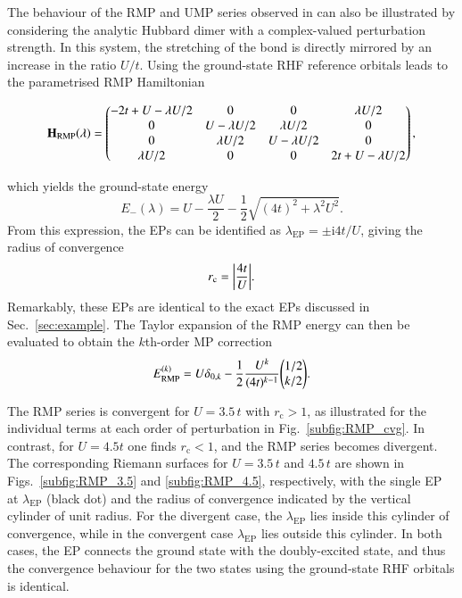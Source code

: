 \documentclass[aps,prb,reprint,noshowkeys,superscriptaddress]{revtex4-1}
\newcommand{\bH}{\mathbf{H}}
\renewcommand{\i}{\mathrm{i}} %
\newcommand{\rc}{r_{\text{c}}}
\newcommand{\lep}{\lambda_{\text{EP}}}
\begin{document}
The behaviour of the RMP and UMP series observed in  can also be illustrated by considering
the analytic Hubbard dimer with a complex-valued perturbation strength.
In this system, the stretching of the  bond is directly mirrored by an increase in the ratio $U/t$.
Using the ground-state RHF reference orbitals leads to the parametrised RMP Hamiltonian
\begin{widetext}
\begin{equation}
\label{eq:H_RMP}
\bH_\text{RMP}\qty(\lambda) = 
	\begin{pmatrix}
		-2t + U - \lambda U/2	&	0					&	0					&	\lambda U/2	\\
		0						&	U - \lambda U/2 	&	\lambda U/2			&	0	\\
		0						&	\lambda U/2			&	U - \lambda U/2 	&	0	\\
		\lambda U/2 			&	0 					&	0					&	2t + U - \lambda U/2	\\
	\end{pmatrix},
\end{equation}
\end{widetext}
which yields the ground-state energy 
\begin{equation}
	\label{eq:E0MP}
	E_{-}(\lambda) = U - \frac{\lambda U}{2} - \frac{1}{2} \sqrt{(4t)^2 + \lambda ^2 U^2}.
\end{equation}
From this expression, the EPs can be identified as $\lep = \pm \i 4t / U$,
giving the radius of convergence
\begin{equation}
    \rc = \abs{\frac{4t}{U}}.
\end{equation}
Remarkably, these EPs are identical to the exact EPs discussed in Sec.~\ref{sec:example}.
The Taylor expansion of the RMP energy can then be evaluated to obtain the $k$th-order MP correction
\begin{equation}
	E_\text{RMP}^{(k)} = U \delta_{0,k} - \frac{1}{2} \frac{U^k}{(4t)^{k-1}} \mqty( 1/2 \\ k/2).
\end{equation}
 
The RMP series is convergent for $U = 3.5\,t$ with $\rc > 1$, as illustrated for the individual terms at each order
of perturbation in Fig.~\ref{subfig:RMP_cvg}.
In contrast, for $U = 4.5t$ one finds $\rc < 1$, and the RMP series becomes divergent.
The corresponding Riemann surfaces for $U = 3.5\,t$ and $4.5\,t$ are shown in Figs.~\ref{subfig:RMP_3.5} and 
\ref{subfig:RMP_4.5}, respectively, with the single EP at $\lep$ (black dot) and the radius of convergence indicated
by the vertical cylinder of unit radius.
For the divergent case, the $\lep$ lies inside this cylinder of convergence, while in the convergent case $\lep$ lies
outside this cylinder.
In both cases, the EP connects the ground state with the doubly-excited state, and thus the convergence behaviour
for the two states using the ground-state RHF orbitals is identical.
\end{document}

